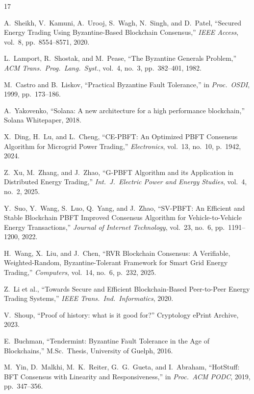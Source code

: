 \documentclass[10pt,twocolumn,letterpaper]{article}
\begin{document}
\begin{thebibliography}{17}

A.~Sheikh, V.~Kamuni, A.~Urooj, S.~Wagh, N.~Singh, and D.~Patel,
``Secured Energy Trading Using Byzantine-Based Blockchain Consensus,''
\emph{IEEE Access}, vol.~8, pp.~8554--8571, 2020.

L.~Lamport, R.~Shostak, and M.~Pease,
``The Byzantine Generals Problem,''
\emph{ACM Trans.\ Prog.\ Lang.\ Syst.}, vol.~4, no.~3, pp.~382--401, 1982.

M.~Castro and B.~Liskov,
``Practical Byzantine Fault Tolerance,''
in \emph{Proc.\ OSDI}, 1999, pp.~173--186.

A.~Yakovenko,
``Solana: A new architecture for a high performance blockchain,''
Solana Whitepaper, 2018.

X.~Ding, H.~Lu, and L.~Cheng,
``CE-PBFT: An Optimized PBFT Consensus Algorithm for Microgrid Power Trading,''
\emph{Electronics}, vol.~13, no.~10, p.~1942, 2024.

Z.~Xu, M.~Zhang, and J.~Zhao,
``G-PBFT Algorithm and its Application in Distributed Energy Trading,''
\emph{Int.\ J.\ Electric Power and Energy Studies}, vol.~4, no.~2, 2025.

Y.~Suo, Y.~Wang, S.~Luo, Q.~Yang, and J.~Zhao,
``SV-PBFT: An Efficient and Stable Blockchain PBFT Improved Consensus Algorithm for Vehicle-to-Vehicle Energy Transactions,''
\emph{Journal of Internet Technology}, vol.~23, no.~6, pp.~1191--1200, 2022.

H.~Wang, X.~Liu, and J.~Chen,
``RVR Blockchain Consensus: A Verifiable, Weighted-Random, Byzantine-Tolerant Framework for Smart Grid Energy Trading,''
\emph{Computers}, vol.~14, no.~6, p.~232, 2025.

Z.~Li et al.,
``Towards Secure and Efficient Blockchain-Based Peer-to-Peer Energy Trading Systems,''
\emph{IEEE Trans.\ Ind.\ Informatics}, 2020.

V.~Shoup,
``Proof of history: what is it good for?''
Cryptology ePrint Archive, 2023.

E.~Buchman,
``Tendermint: Byzantine Fault Tolerance in the Age of Blockchains,''
M.Sc.\ Thesis, University of Guelph, 2016.

M.~Yin, D.~Malkhi, M.~K.~Reiter, G.~G.~Gueta, and I.~Abraham,
``HotStuff: BFT Consensus with Linearity and Responsiveness,''
in \emph{Proc.\ ACM PODC}, 2019, pp.~347--356.


\end{thebibliography}
\end{document}
